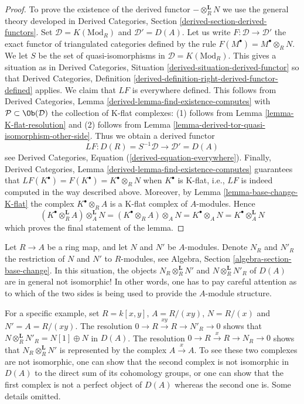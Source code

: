 \begin{proof}
To prove the existence of the derived functor $- \otimes_R^\mathbf{L} N$
we use the general theory developed in
Derived Categories, Section \ref{derived-section-derived-functors}.
Set $\mathcal{D} = K(\text{Mod}_R)$ and $\mathcal{D}' = D(A)$.
Let us write $F : \mathcal{D} \to \mathcal{D}'$ the exact functor
of triangulated categories defined by the rule
$F(M^\bullet) = M^\bullet \otimes_R N$. We let $S$ be the set of
quasi-isomorphisms in $\mathcal{D} = K(\text{Mod}_R)$.
This gives a situation as in
Derived Categories, Situation \ref{derived-situation-derived-functor}
so that
Derived Categories, Definition
\ref{derived-definition-right-derived-functor-defined}
applies. We claim that $LF$ is everywhere defined.
This follows from
Derived Categories, Lemma \ref{derived-lemma-find-existence-computes}
with $\mathcal{P} \subset \Ob(\mathcal{D})$ the collection
of K-flat complexes: (1) follows from
Lemma \ref{lemma-K-flat-resolution}
and (2) follows from
Lemma \ref{lemma-derived-tor-quasi-isomorphism-other-side}.
Thus we obtain a derived functor
$$
LF : D(R) = S^{-1}\mathcal{D} \longrightarrow \mathcal{D}' = D(A)
$$
see
Derived Categories, Equation (\ref{derived-equation-everywhere}).
Finally,
Derived Categories, Lemma \ref{derived-lemma-find-existence-computes}
guarantees that $LF(K^\bullet) = F(K^\bullet) = K^\bullet \otimes_R N$
when $K^\bullet$ is K-flat, i.e., $LF$ is indeed computed in the way
described above. Moreover, by Lemma \ref{lemma-base-change-K-flat}
the complex $K^\bullet \otimes_R A$ is a K-flat complex of $A$-modules.
Hence
$$
(K^\bullet \otimes_R^\mathbf{L} A) \otimes_A^\mathbf{L} N =
(K^\bullet \otimes_R A) \otimes_A N =
K^\bullet \otimes_A N =
K^\bullet \otimes_A^\mathbf{L} N
$$
which proves the final statement of the lemma.
\end{proof}

\begin{remark}[Warning]
\label{remark-warning-compute-base-change}
Let $R \to A$ be a ring map, and let $N$ and $N'$ be $A$-modules.
Denote $N_R$ and $N'_R$ the restriction of $N$ and $N'$ to $R$-modules,
see Algebra, Section \ref{algebra-section-base-change}.
In this situation, the objects $N_R \otimes_R^\mathbf{L} N'$
and $N \otimes_R^\mathbf{L} N'_R$ of $D(A)$ are in general
not isomorphic! In other words, one has to pay careful attention
as to which of the two sides is being used to provide the
$A$-module structure.

\medskip\noindent
For a specific example, set $R = k[x, y]$, $A = R/(xy)$, $N = R/(x)$
and $N' = A = R/(xy)$. The resolution
$0 \to R \xrightarrow{xy} R \to N'_R \to 0$
shows that $N \otimes_R^\mathbf{L} N'_R = N[1] \oplus N$ in $D(A)$.
The resolution
$0 \to R \xrightarrow{x} R \to N_R \to 0$
shows that $N_R \otimes_R^\mathbf{L} N'$ is represented by
the complex $A \xrightarrow{x} A$. To see these two complexes
are not isomorphic, one can show that the second complex is
not isomorphic in $D(A)$ to the direct sum of its cohomology groups,
or one can show that the first complex is not a perfect object of $D(A)$
whereas the second one is. Some details omitted.
\end{remark}

